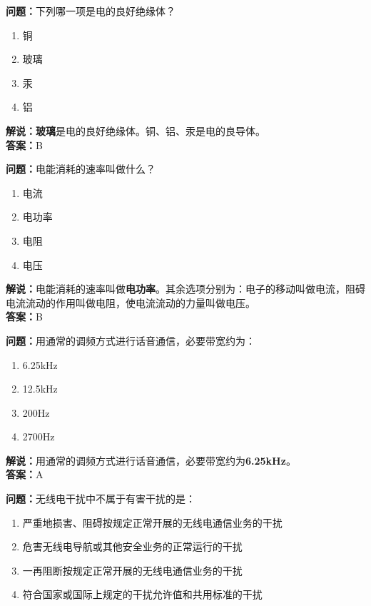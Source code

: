 \textbf{问题：}下列哪一项是电的良好绝缘体？

\begin{enumerate}[label=\Alph*), leftmargin=1.5cm]
	\item 铜
	\item 玻璃
	\item 汞
	\item 铝
\end{enumerate}

\textbf{解说：}\textbf{玻璃}是电的良好绝缘体。铜、铝、汞是电的良导体。\\\textbf{答案：}B



\textbf{问题：}电能消耗的速率叫做什么？

\begin{enumerate}[label=\Alph*), leftmargin=1.5cm]
	\item 电流
	\item 电功率
	\item 电阻
	\item 电压
\end{enumerate}

\textbf{解说：}电能消耗的速率叫做\textbf{电功率}。其余选项分别为：电子的移动叫做电流，阻碍电流流动的作用叫做电阻，使电流流动的力量叫做电压。\\\textbf{答案：}B



\textbf{问题：}用通常的调频方式进行话音通信，必要带宽约为：

\begin{enumerate}[label=\Alph*), leftmargin=1.5cm]
	\item 6.25kHz
	\item 12.5kHz
	\item 200Hz
	\item 2700Hz
\end{enumerate}

\textbf{解说：}用通常的调频方式进行话音通信，必要带宽约为\textbf{6.25kHz}。\\\textbf{答案：}A%



\textbf{问题：}无线电干扰中不属于有害干扰的是：

\begin{enumerate}[label=\Alph*), leftmargin=1.5cm]
	\item 严重地损害、阻碍按规定正常开展的无线电通信业务的干扰
	\item 危害无线电导航或其他安全业务的正常运行的干扰
	\item 一再阻断按规定正常开展的无线电通信业务的干扰
	\item 符合国家或国际上规定的干扰允许值和共用标准的干扰
\end{enumerate}

